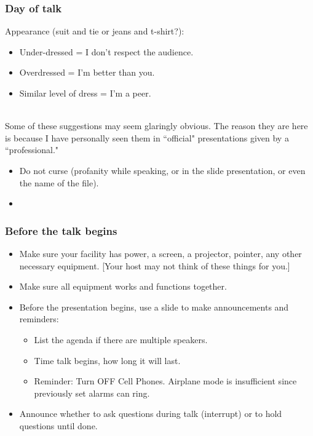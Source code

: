 \subsubsection*{Day of talk}

Appearance (suit and tie or jeans and t-shirt?):
\begin{itemize}
    \item Under-dressed = I don't respect the audience.
    \item Overdressed = I'm better than you.
    \item Similar level of dress = I'm a peer.
\end{itemize}

\ \\

Some of these suggestions may seem glaringly obvious. The reason they are here is because I have personally seen them in ``official" presentations given by a ``professional."
\begin{itemize}
    \item Do not curse (profanity while speaking, or in the slide presentation, or even the name of the file).
    
    \item 
\end{itemize}
\subsubsection*{Before the talk begins}
\begin{itemize}
    \item Make sure your facility has power, a screen, a projector, pointer, any other necessary equipment. [Your host may not think of these things for you.]
    \item Make sure all equipment works and functions together.
    \item Before the presentation begins, use a slide to make announcements and reminders:
\begin{itemize}
    \item List the agenda if there are multiple speakers.
    \item Time talk begins, how long it will last.
    \item Reminder: Turn OFF Cell Phones. Airplane mode is insufficient since previously set alarms can ring.
\end{itemize}
    \item Announce whether to ask questions during talk (interrupt) or to hold questions until done.
\end{itemize}

